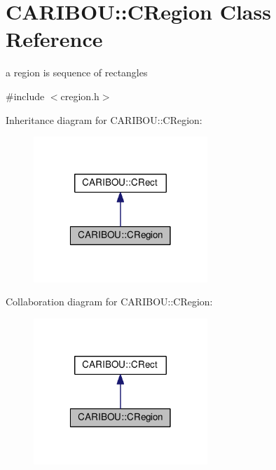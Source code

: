 \section{C\-A\-R\-I\-B\-O\-U\-:\-:C\-Region Class Reference}
\label{class_c_a_r_i_b_o_u_1_1_c_region}


a region is sequence of rectangles  




{\ttfamily \#include $<$cregion.\-h$>$}



Inheritance diagram for C\-A\-R\-I\-B\-O\-U\-:\-:C\-Region\-:\nopagebreak
\begin{figure}[H]
\begin{center}
\leavevmode
\includegraphics[width=186pt]{class_c_a_r_i_b_o_u_1_1_c_region__inherit__graph}
\end{center}
\end{figure}


Collaboration diagram for C\-A\-R\-I\-B\-O\-U\-:\-:C\-Region\-:\nopagebreak
\begin{figure}[H]
\begin{center}
\leavevmode
\includegraphics[width=186pt]{class_c_a_r_i_b_o_u_1_1_c_region__coll__graph}
\end{center}
\end{figure}

